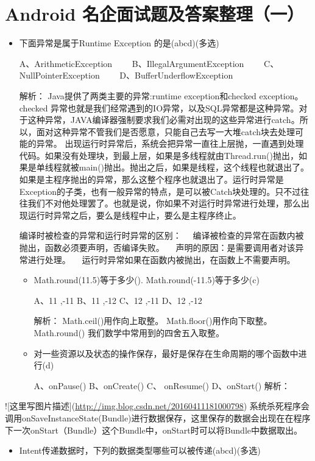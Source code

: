 \documentclass[9pt, b5paper]{article}
\begin{document}
\section{Android 名企面试题及答案整理（一）}
\label{sec-16}
\begin{itemize}
\item 下面异常是属于Runtime Exception 的是(abcd)(多选)      

A、ArithmeticException　　
B、IllegalArgumentException　　
C、NullPointerException　　
D、BufferUnderflowException

解析：
    Java提供了两类主要的异常:runtime exception和checked exception。checked 异常也就是我们经常遇到的IO异常，以及SQL异常都是这种异常。对于这种异常，JAVA编译器强制要求我们必需对出现的这些异常进行catch。所以，面对这种异常不管我们是否愿意，只能自己去写一大堆catch块去处理可能的异常。
出现运行时异常后，系统会把异常一直往上层抛，一直遇到处理代码。如果没有处理块，到最上层，如果是多线程就由Thread.run()抛出，如果是单线程就被main()抛出。抛出之后，如果是线程，这个线程也就退出了。如果是主程序抛出的异常，那么这整个程序也就退出了。运行时异常是Exception的子类，也有一般异常的特点，是可以被Catch块处理的。只不过往往我们不对他处理罢了。也就是说，你如果不对运行时异常进行处理，那么出现运行时异常之后，要么是线程中止，要么是主程序终止。

编译时被检查的异常和运行时异常的区别：
　编译被检查的异常在函数内被抛出，函数必须要声明，否编译失败。
　声明的原因：是需要调用者对该异常进行处理。
　运行时异常如果在函数内被抛出，在函数上不需要声明。
\begin{itemize}
\item Math.round(11.5)等于多少(). Math.round(-11.5)等于多少(c)

A、11 ,-11 B、11 ,-12 C、12 ,-11 D、12 ,-12

解析：
  Math.ceil()用作向上取整。
  Math.floor()用作向下取整。
  Math.round() 我们数学中常用到的四舍五入取整。
\item 对一些资源以及状态的操作保存，最好是保存在生命周期的哪个函数中进行(d) 

 A、onPause() B、onCreate() C、 onResume() D、onStart()
解析：
\end{itemize}
\end{itemize}
![这里写图片描述](\url{http://img.blog.csdn.net/20160411181000798})
系统杀死程序会调用onSaveInstanceState(Bundle)进行数据保存，这里保存的数据会出现在在程序下一次onStart（Bundle）这个Bundle中，onStart时可以将Bundle中数据取出。
\begin{itemize}
\item Intent传递数据时，下列的数据类型哪些可以被传递(abcd)(多选)
\end{itemize}
\end{document}
